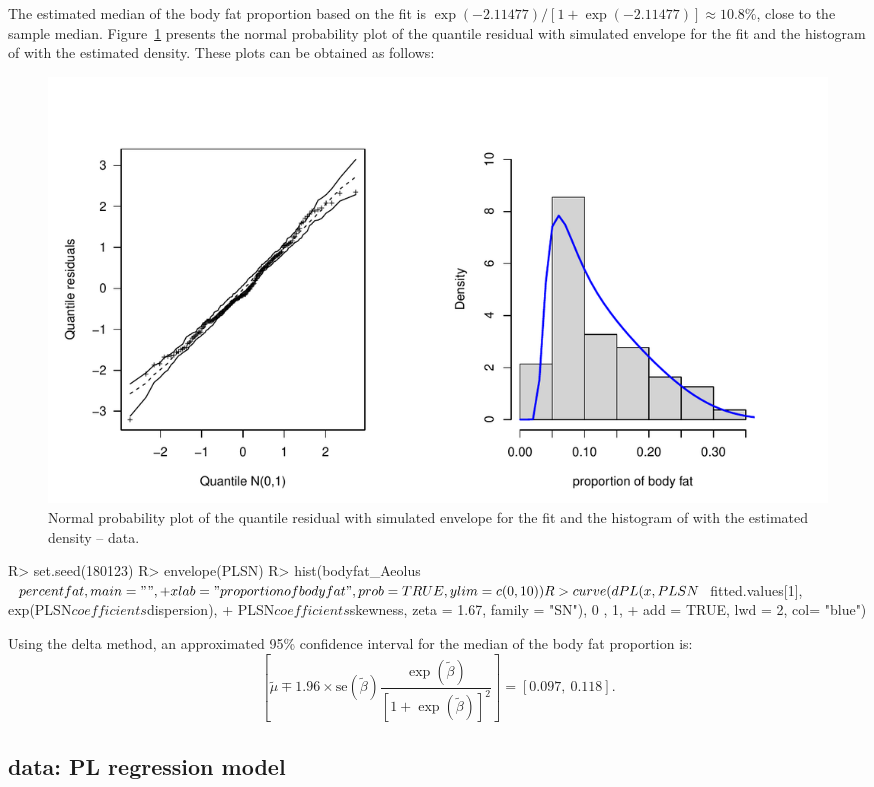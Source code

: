 The estimated median of the body fat proportion based on the fit is $\exp(-2.11477)/[1+\exp(-2.11477)] \approx 10.8\%$, close to the sample median. Figure~\ref{fig:Fig4} presents the normal probability plot of the quantile residual with simulated envelope for the  fit and the histogram of  with the estimated density. These plots can be obtained as follows:
\begin{figure}[t!]
\centering
\includegraphics[scale=0.6]{figures/Fig4}
\caption{\label{fig:Fig4} Normal probability plot of the quantile residual with simulated envelope for the  fit and the histogram of  with the estimated density --  data.}
\end{figure}
\begin{Schunk}
\begin{Sinput}
R> set.seed(180123)
R> envelope(PLSN)
R> hist(bodyfat_Aeolus$percentfat, main = " ",
+      xlab = "proportion of body fat", prob = TRUE, ylim = c(0, 10))
R> curve(dPL(x, PLSN$fitted.values[1], exp(PLSN$coefficients$dispersion),
+           PLSN$coefficients$skewness, zeta = 1.67, family = "SN"), 0 , 1, 
+	add = TRUE, lwd = 2, col= "blue")
\end{Sinput}
\end{Schunk}

Using the delta method, an approximated 95\% confidence interval for the median of the body fat proportion is:
\[
\left[\widetilde{\mu} \mp 1.96 \times \mbox{se}(\widetilde{\beta}) \dfrac{\exp(\widetilde{\beta})}{[1+\exp(\widetilde{\beta})]^2}\right] = [ 0.097,~ 0.118].
\]


\subsection[R code]{ data: PL regression model}

